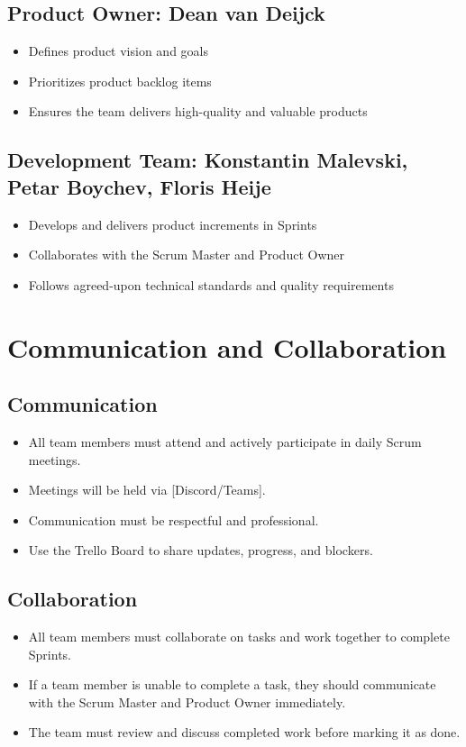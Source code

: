 \documentclass{article}
\begin{document}
\subsection{Product Owner: Dean van Deijck}
\begin{itemize}
    \item Defines product vision and goals
    \item Prioritizes product backlog items
    \item Ensures the team delivers high-quality and valuable products
\end{itemize}

\subsection{Development Team: Konstantin Malevski, Petar Boychev, Floris Heije}
\begin{itemize}
    \item Develops and delivers product increments in Sprints
    \item Collaborates with the Scrum Master and Product Owner
    \item Follows agreed-upon technical standards and quality requirements
\end{itemize}
\newpage
\section{Communication and Collaboration}

\subsection{Communication}
\begin{itemize}
    \item All team members must attend and actively participate in daily Scrum meetings.
    \item Meetings will be held via [Discord/Teams].
    \item Communication must be respectful and professional.
    \item Use the Trello Board to share updates, progress, and blockers.
\end{itemize}

\subsection{Collaboration}
\begin{itemize}
    \item All team members must collaborate on tasks and work together to complete Sprints.
    \item If a team member is unable to complete a task, they should communicate with the Scrum Master and Product Owner immediately.
    \item The team must review and discuss completed work before marking it as done.
\end{itemize}
\end{document}
